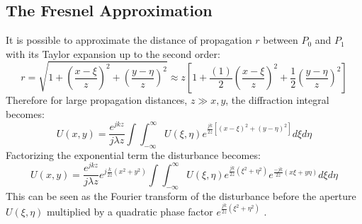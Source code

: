 \subsection{The Fresnel Approximation}
\label{sec:fresnelapprox}
It is possible to approximate the distance of propagation $r$ between $P_0$ and $P_1$ with its Taylor expansion up to the second order:
\begin{equation}
\label{eq:taylor}
r=\sqrt{1+\left(\dfrac{x-\xi}{z}\right)^2+\left(\dfrac{y-\eta}{z}\right)^2}\approx z\left[1+\frac{(1)}{2}\left(\dfrac{x-\xi}{z}\right)^2+\frac{1}{2}\left(\dfrac{y-\eta}{z}\right)^2\right]
\end{equation}
Therefore for large propagation distances, $z\gg x,y$, the diffraction integral becomes:
\begin{equation}
\label{eq:Fresnel}
	U(x,y)=\dfrac{e^{jkz}}{j\lambda z} \int\int_{-\infty}^{\infty}U(\xi,\eta)e^{\frac{jk}{2z}\left[(x-\xi)^2+(y-\eta)^2\right]} d\xi d\eta
\end{equation}
Factorizing the exponential term the disturbance becomes:
\begin{equation}
\label{eq:Fresnel1}
U(x,y)=\dfrac{e^{jkz}}{j\lambda z} e^{j\frac{k}{2z}(x^2+y^2)} \int\int_{-\infty}^{\infty}U(\xi,\eta)e^{\frac{jk}{2z}(\xi^2+\eta^2)}e^{\frac{-jk}{2z}(x\xi+y\eta)} d\xi d\eta
\end{equation}
This can be seen as the Fourier transform of the disturbance before the aperture $U(\xi,\eta)$ multiplied by a quadratic phase factor
 $e^{\frac{jk}{2z}(\xi^2+\eta^2)}$ \cite{goodman2005introduction}.
